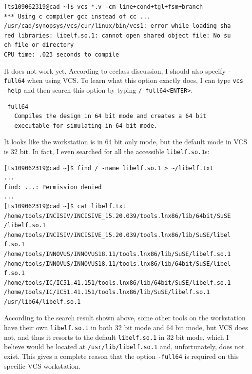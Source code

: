 \documentclass{article}
\begin{document}
\begin{verbatim}
[ts109062319@cad ~]$ vcs *.v -cm line+cond+tgl+fsm+branch
*** Using c compiler gcc instead of cc ...
/usr/cad/synopsys/vcs/cur/linux/bin/vcs1: error while loading sha
red libraries: libelf.so.1: cannot open shared object file: No su
ch file or directory
CPU time: .023 seconds to compile
\end{verbatim}

It does not work yet. According to eeclass discussion, I should also specify \verb|-full64| when using VCS. To learn what this option exactly does, I can type \verb|vcs -help| and then search this option by typing \verb|/-full64<ENTER>|.

\begin{verbatim}
-full64
   Compiles the design in 64 bit mode and creates a 64 bit
   executable for simulating in 64 bit mode.
\end{verbatim}

It looks like the workstation is in 64 bit only mode, but the default mode in VCS is 32 bit. In fact, I even searched for all the accessible \verb|libelf.so.1|s:

\begin{verbatim}
[ts109062319@cad ~]$ find / -name libelf.so.1 > ~/libelf.txt
...
find: ...: Permission denied
...
[ts109062319@cad ~]$ cat libelf.txt
/home/tools/INCISIV/INCISIVE_15.20.039/tools.lnx86/lib/64bit/SuSE
/libelf.so.1
/home/tools/INCISIV/INCISIVE_15.20.039/tools.lnx86/lib/SuSE/libel
f.so.1
/home/tools/INNOVUS/INNOVUS18.11/tools.lnx86/lib/SuSE/libelf.so.1
/home/tools/INNOVUS/INNOVUS18.11/tools.lnx86/lib/64bit/SuSE/libel
f.so.1
/home/tools/IC/IC51.41.151/tools.lnx86/lib/64bit/SuSE/libelf.so.1
/home/tools/IC/IC51.41.151/tools.lnx86/lib/SuSE/libelf.so.1
/usr/lib64/libelf.so.1
\end{verbatim}

According to the search result shown above, some other tools on the workstation have their own \verb|libelf.so.1| in both 32 bit mode and 64 bit mode, but VCS does not, and thus it resorts to the default \verb|libelf.so.1| in 32 bit mode, which I believe would be located at \verb|/usr/lib/libelf.so.1| and, unfortunately, does not exist. This gives a complete reason that the option \verb|-full64| is required on this specific VCS workstation.
\end{document}
